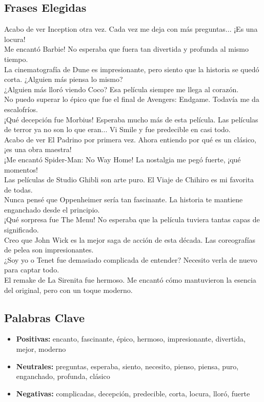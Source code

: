 \documentclass{article}
\begin{document}
    \subsection{Frases Elegidas}
        Acabo de ver Inception otra vez. Cada vez me deja con más preguntas... ¡Es una locura!\\
Me encantó Barbie! No esperaba que fuera tan divertida y profunda al mismo tiempo.\\
La cinematografía de Dune es impresionante, pero siento que la historia se quedó corta. ¿Alguien más piensa lo mismo?\\
¿Alguien más lloró viendo Coco? Esa película siempre me llega al corazón.\\
No puedo superar lo épico que fue el final de Avengers: Endgame. Todavía me da escalofríos.\\
¡Qué decepción fue Morbius! Esperaba mucho más de esta película.
Las películas de terror ya no son lo que eran... Vi Smile y fue predecible en casi todo.\\
Acabo de ver El Padrino por primera vez. Ahora entiendo por qué es un clásico, ¡es una obra maestra!\\
¡Me encantó Spider-Man: No Way Home! La nostalgia me pegó fuerte, ¡qué momentos!\\
Las películas de Studio Ghibli son arte puro. El Viaje de Chihiro es mi favorita de todas.\\
Nunca pensé que Oppenheimer sería tan fascinante. La historia te mantiene enganchado desde el principio.\\
¡Qué sorpresa fue The Menu! No esperaba que la película tuviera tantas capas de significado.\\
Creo que John Wick es la mejor saga de acción de esta década. Las coreografías de pelea son impresionantes.\\
¿Soy yo o Tenet fue demasiado complicada de entender? Necesito verla de nuevo para captar todo.\\
El remake de La Sirenita fue hermoso. Me encantó cómo mantuvieron la esencia del original, pero con un toque moderno.\\


\subsection{Palabras Clave}
\begin{itemize}
    \item \textbf{Positivas:} encanto, fascinante, épico, hermoso, impresionante, divertida, mejor, moderno
    \item \textbf{Neutrales:}  preguntas, esperaba, siento, necesito, pienso, piensa, puro, enganchado, profunda, clásico
    \item \textbf{Negativas:} complicadas, decepción, predecible, corta, locura, lloró, fuerte

\end{itemize}
\end{document}
